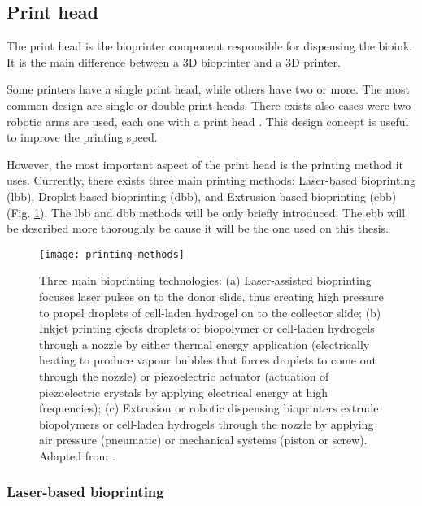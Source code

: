 
\subsection{Print head}
\label{subsec:print_head}

The print head is the bioprinter component responsible for dispensing the bioink. It is the main difference between a 3D bioprinter and a 3D printer.

Some printers have a single print head, while others have two or more. The most common design are single or double print heads. There exists also cases were two robotic arms are used, each one with a print head \cite{Ozbolat2014_multi_arm_bioprinter}. This design concept is useful to improve the printing speed.

However, the most important aspect of the print head is the printing method it uses. Currently, there exists three main printing methods: Laser-based bioprinting (\gls{lbb}), Droplet-based bioprinting (\gls{dbb}), and Extrusion-based bioprinting (\gls{ebb}) (Fig. \ref{fig:printing_methods}). The \gls{lbb} and \gls{dbb} methods will be only briefly introduced. The \gls{ebb} will be described more thoroughly be cause it will be the one used on this thesis.

\begin{figure}[htbp]
	\centering
	\texttt{[image: printing\_methods]}
	\caption{Three main bioprinting technologies: (a) Laser-assisted bioprinting focuses laser pulses on to the donor slide, thus creating high pressure to propel droplets of cell-laden hydrogel on to the collector slide; (b) Inkjet printing ejects droplets of biopolymer or cell-laden hydrogels through a nozzle by either thermal energy application (electrically heating to produce vapour bubbles that forces droplets to come out through the nozzle) or piezoelectric actuator (actuation of piezoelectric crystals by applying electrical energy at high frequencies); (c) Extrusion or robotic dispensing bioprinters extrude biopolymers or cell-laden hydrogels through the nozzle by applying air pressure (pneumatic) or mechanical systems (piston or screw). Adapted from \cite{Vijayavenkataraman2016_stateart_modelling_materials_processing}.}
	\label{fig:printing_methods}
\end{figure}

\subsubsection{Laser-based bioprinting}
\label{subsubsec:laser_based_bioprinting}

